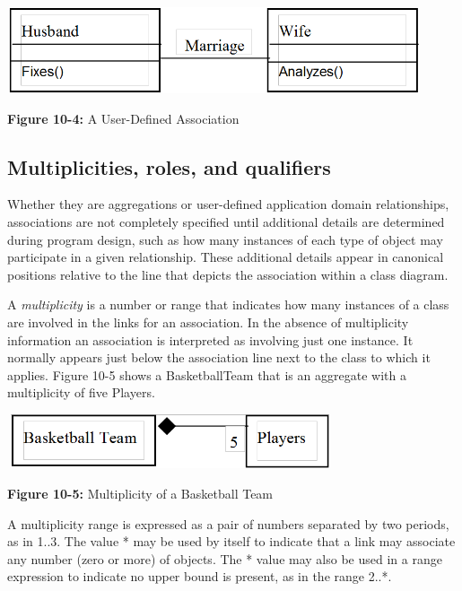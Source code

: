 \begin{center}
\includegraphics[width=4.8in,height=1.0in]{ub-img/marriage.png} 

{\sffamily\bfseries Figure 10-4:}
{\sffamily A User-Defined Association}
\end{center}

\subsection{Multiplicities, roles, and qualifiers}

Whether they are aggregations or user-defined application domain
relationships, associations are not completely specified until
additional details are determined during program design, such as how
many instances of each type of object may participate in a given
relationship. These additional details appear in canonical positions
relative to the line that depicts the association within a class
diagram.

A \textit{multiplicity} is a number or range that
indicates how many instances of a class are involved in the links for
an association. In the absence of multiplicity information an
association is interpreted as involving just one instance. It normally
appears just below the association line next to the class to which it
applies. Figure 10-5 shows a BasketballTeam that is an aggregate with a
multiplicity of five Players.

\begin{center}
\includegraphics[width=3.78in,height=0.63in]{ub-img/multipcy.png}

{\sffamily\bfseries Figure 10-5:}
{\sffamily Multiplicity of a Basketball Team}
\end{center}

A multiplicity range is expressed as a pair of numbers separated by two
periods, as in 1..3. The value * may be used by itself to indicate that
a link may associate any number (zero or more) of objects. The * value
may also be used in a range expression to indicate no upper bound is
present, as in the range 2..*.


